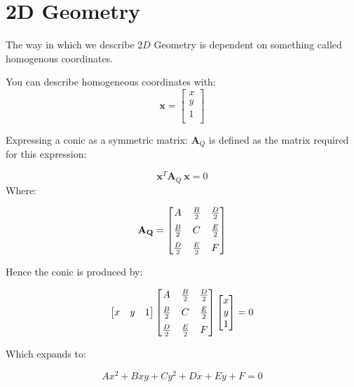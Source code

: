 \documentclass{article}
\author{Alex Hiller}
\title{}
\begin{document}
\maketitle

\section{2D Geometry} 
The way in which we describe  $ 2D $ Geometry is dependent on something called
homogenous coordinates.

You can describe homogeneous coordinates with:
\[%
    \mathbf{x} = 
    \begin{bmatrix}
        x \\		
        y \\
        1 \\
    \end{bmatrix}
\]%

Expressing a conic as a symmetric matrix: $ \mathbf{A}_{Q} $  is defined as the
matrix required for this expression:

\[%
    \mathbf{x}^{T}\mathbf{A}_{Q} \ \mathbf{x} = 0
\]%
Where:

\[%
    \mathbf{A_{Q} }
    = 
    \begin{bmatrix}\vspace{2mm}
        A            & \frac{B}{2}  & \frac{D}{2}  \\ \vspace{2mm}
        \frac{B}{2}  & C            & \frac{E}{2}  \\
        \frac{D}{2}  & \frac{E}{2}  & F \\		
    \end{bmatrix}
\]%

Hence the conic is produced by:

\[%
    \begin{bmatrix}
        x & y & 1 \\
    \end{bmatrix}
    \begin{bmatrix}\vspace{2mm}
        A            & \frac{B}{2}  & \frac{D}{2}  \\ \vspace{2mm}
        \frac{B}{2}  & C            & \frac{E}{2}  \\
        \frac{D}{2}  & \frac{E}{2}  & F \\		
    \end{bmatrix}
    \begin{bmatrix}
        x \\		y \\
        1 \\
    \end{bmatrix}
    = 0
\]%

Which expands to:

\[%
    Ax^{2}+Bxy+Cy^{2}+Dx+Ey+F = 0
\]%
\end{document}

